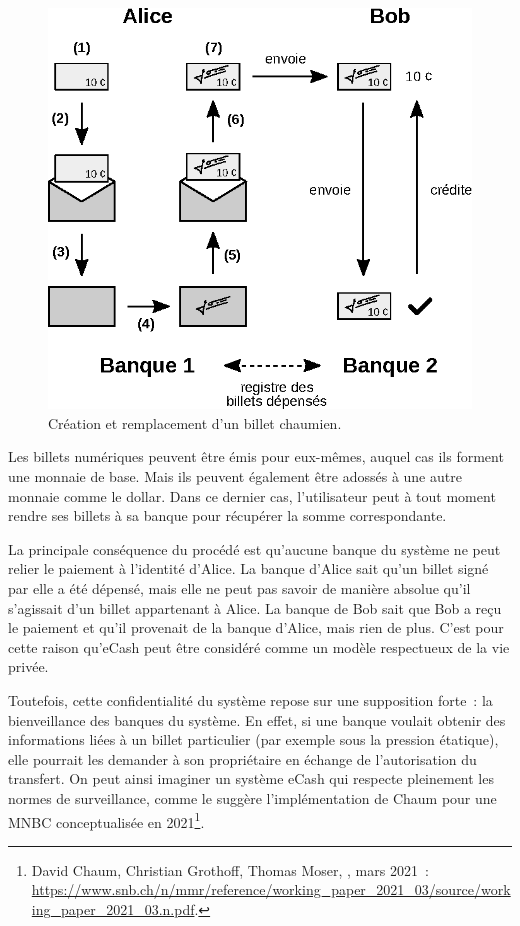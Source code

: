 \begin{figure}[h]
  \centering
  \includegraphics[scale=0.75]{img/chaumian-ecash.eps}
  \caption{Création et remplacement d'un billet chaumien.}
\end{figure}

Les billets numériques peuvent être émis pour eux-mêmes, auquel cas ils forment une monnaie de base. Mais ils peuvent également être adossés à une autre monnaie comme le dollar. Dans ce dernier cas, l'utilisateur peut à tout moment rendre ses billets à sa banque pour récupérer la somme correspondante.

La principale conséquence du procédé est qu'aucune banque du système ne peut relier le paiement à l'identité d'Alice. La banque d'Alice sait qu'un billet signé par elle a été dépensé, mais elle ne peut pas savoir de manière absolue qu'il s'agissait d'un billet appartenant à Alice. La banque de Bob sait que Bob a reçu le paiement et qu'il provenait de la banque d'Alice, mais rien de plus. C'est pour cette raison qu'eCash peut être considéré comme un modèle respectueux de la vie privée.

Toutefois, cette confidentialité du système repose sur une supposition forte~: la bienveillance des banques du système. En effet, si une banque voulait obtenir des informations liées à un billet particulier (par exemple sous la pression étatique), elle pourrait les demander à son propriétaire en échange de l'autorisation du transfert. On peut ainsi imaginer un système eCash qui respecte pleinement les normes de surveillance, comme le suggère l'implémentation de Chaum pour une MNBC conceptualisée en 2021\footnote{David Chaum, Christian Grothoff, Thomas Moser, , mars 2021~: \url{https://www.snb.ch/n/mmr/reference/working_paper_2021_03/source/working_paper_2021_03.n.pdf}.}.

